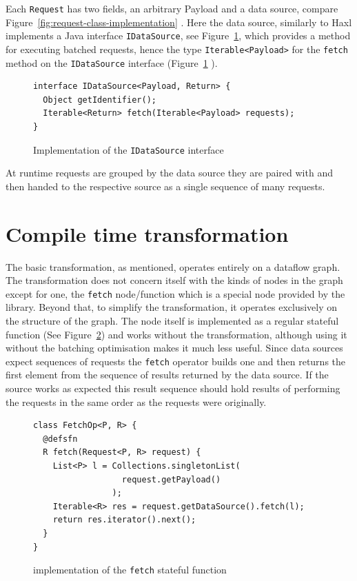 Each \texttt{Request} has two fields, an arbitrary Payload and a data source, compare Figure~\ref{fig:request-class-implementation} .
Here the data source, similarly to Haxl implements a Java interface \texttt{IDataSource}, see Figure~\ref{fig:idatasource-interface-implementation}, which provides a method for executing batched requests, hence the type \texttt{Iterable<Payload>} for the \texttt{fetch} method on the \texttt{IDataSource} interface (Figure~\ref{fig:idatasource-interface-implementation}   ).

\begin{figure}[h]
\begin{verbatim}
interface IDataSource<Payload, Return> {
  Object getIdentifier();
  Iterable<Return> fetch(Iterable<Payload> requests);
}
\end{verbatim}
\caption{Implementation of the \texttt{IDataSource} interface}
\label{fig:idatasource-interface-implementation}
\end{figure}

At runtime requests are grouped by the data source they are paired with and then handed to the respective source as a single sequence of many requests.

\section{Compile time transformation}

The basic \yauhau{} transformation, as mentioned, operates entirely on a dataflow graph.
The transformation does not concern itself with the kinds of nodes in the graph except for one, the \texttt{fetch} node/function which is a special node provided by the \yauhau{} library.
Beyond that, to simplify the transformation, it operates exclusively on the structure of the graph.
The \fetch{} node itself is implemented as a regular stateful function (See Figure~\ref{fig:fetch-implementation}) and works without the \yauhau{} transformation, although using it without the batching optimisation makes it much less useful.
Since data sources expect sequences of requests the \texttt{fetch} operator builds one and then returns the first element from the sequence of results returned by the data source.
If the source works as expected this result sequence should hold results of performing the requests in the same order as the requests were originally.

\begin{figure}[h]
\begin{verbatim}
class FetchOp<P, R> {
  @defsfn
  R fetch(Request<P, R> request) {
    List<P> l = Collections.singletonList(
                  request.getPayload()
                );
    Iterable<R> res = request.getDataSource().fetch(l);
    return res.iterator().next();
  }
}
\end{verbatim}
\caption{implementation of the \texttt{fetch} stateful function}
\label{fig:fetch-implementation}
\end{figure}


